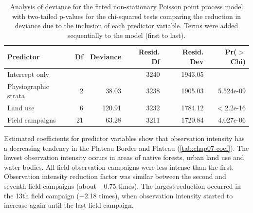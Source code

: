 \begin{table}[!ht]
 \caption{Analysis of deviance for the fitted non-stationary Poisson point process model with two-tailed 
 p-values for the chi-squared tests comparing the reduction in deviance due to the inclusion of each predictor 
 variable. Terms were added sequentially to the model (first to last).}
 \label{tab:chap07-deviance}
 \centering\footnotesize
 \begin{tabular}{lrrrrr}
  \hline
  Predictor		& Df	& Deviance	& Resid. Df	& Resid. Dev	& Pr($>$Chi)	\\ 
  \hline
  Intercept only	&  	&  		& 3240 		& 1943.05 	&  		\\ 
  Physiographic strata	& 2 	& 38.03 	& 3238 		& 1905.03 	& 5.524e-09 	\\ 
  Land use		& 6 	& 120.91 	& 3232 		& 1784.12 	& < 2.2e-16 	\\ 
  Field campaigns	& 21 	& 63.28 	& 3211 		& 1720.84 	& 4.027e-06 	\\ 
  \hline
 \end{tabular}
\end{table}

Estimated coefficients for predictor variables show that observation intensity has a decreasing tendency in the
Plateau Border and Plateau (\autoref{tab:chap07-coef}). The lowest observation intensity occurs in areas of 
native forests, urban land use and water bodies. All field observation campaigns were less intense than the 
first. Observation intensity reduction factor was similar between the second and seventh field campaigns 
(about \num{-0.75} times). The largest reduction occurred in the \num{13}th field campaign (\num{-2.18} 
times), 
when observation intensity started to increase again until the last field campaign.

